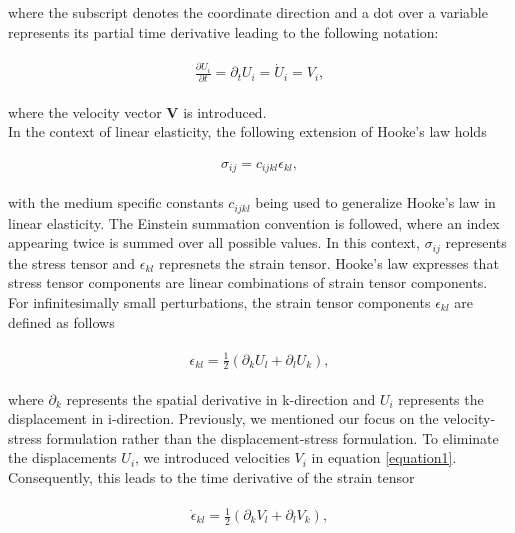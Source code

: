 where the subscript denotes the coordinate direction and a dot over a variable represents its partial time derivative leading to the following notation:

\begin{align}
    \begin{split}
        \frac{\partial U_i}{\partial t} = \partial_t U_i = \dot{U}_i = V_i,
    \end{split}
    \label{equation1}
\end{align}

where the velocity vector \textbf{V} is introduced. \\

In the context of linear elasticity, the following extension of Hooke's law holds

\begin{align}
    \begin{split}
        \sigma_{ij} = c_{ijkl}\epsilon_{kl},
    \end{split}
    \label{eq:hookeslaw}
\end{align}

with the medium specific constants $c_{ijkl}$ being used to generalize Hooke's law in linear elasticity. The Einstein summation convention
is followed, where an index appearing twice is summed over all possible values. In this context, $\sigma_{ij}$ represents the stress tensor
and $\epsilon_{kl}$ represnets the strain tensor. Hooke's law expresses that stress tensor components are linear combinations of strain tensor
components. For infinitesimally small perturbations, the strain tensor components $\epsilon_{kl}$ are defined as follows

\begin{align}
    \begin{split}
        \epsilon_{kl} = \frac{1}{2}\left(\partial_k U_l + \partial_l U_k \right) ,
    \end{split}
\end{align}

where $\partial_k$ represents the spatial derivative in k-direction and $U_i$ represents the displacement in i-direction.
Previously, we mentioned our focus on the velocity-stress formulation rather than the displacement-stress formulation.
To eliminate the displacements $U_i$, we introduced velocities $V_i$ in equation \ref{equation1}.
Consequently, this leads to the time derivative of the strain tensor

\begin{align}
    \begin{split}
        \dot{\epsilon}_{kl} = \frac{1}{2}\left( \partial_k V_l + \partial_l V_k \right) ,
    \end{split}
\end{align}

